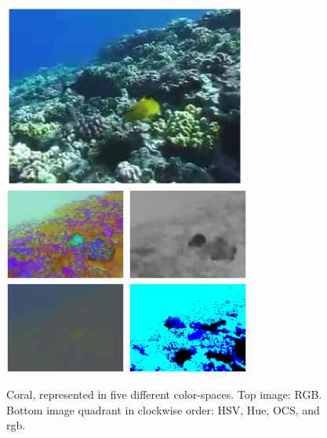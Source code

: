\documentclass[a4paper,11pt]{article}
\begin{document}
		\begin{figure}[H]
			\begin{center}
				\includegraphics[width=8cm]{img/cs_RGB.eps}\\
				\includegraphics[width=4cm]{img/cs_HSV.eps}
				\includegraphics[width=4cm]{img/cs_Hue.eps}\\
				\includegraphics[width=4cm]{img/cs_nRGB.eps}
				\includegraphics[width=4cm]{img/cs_OCS.eps}
			\end{center}
			\caption{
				Coral, represented in five different color-spaces. Top image:
				RGB. Bottom image quadrant in clockwise order: HSV, Hue, OCS,
				and rgb.
			}
		\end{figure}
\end{document}
